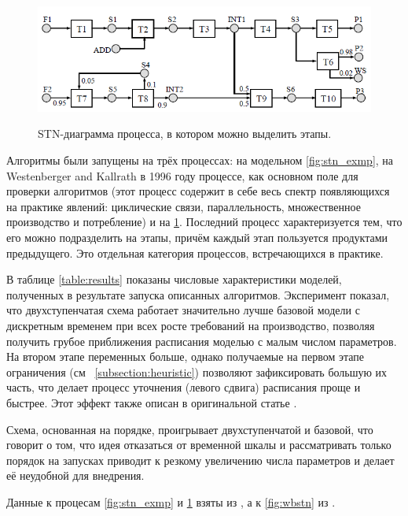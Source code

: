 \documentclass[12pt, twoside]{article}
\theoremstyle{definition}
\begin{document}
\begin{figure}[h]
\caption{STN-диаграмма процесса, в котором можно выделить этапы.}
\centering
\includegraphics[width=1.0\textwidth]{stagedstn}
\label{fig:stn_staged}
\end{figure}

Алгоритмы были запущены на трёх процессах: на модельном \ref{fig:stn_exmp}, на Westenberger and Kallrath в 1996 году процессе, как основном поле для проверки алгоритмов (этот процесс содержит в себе весь спектр появляющихся на практике явлений: циклические связи, параллельность, множественное производство и потребление) и на \ref{fig:stn_staged}. Последний процесс характеризуется тем, что его можно подразделить на этапы, причём каждый этап пользуется продуктами предыдущего. Это отдельная категория процессов, встречающихся в практике.

В таблице \ref{table:results} показаны числовые характеристики моделей, полученных в результате запуска описанных алгоритмов. Эксперимент показал, что двухступенчатая схема работает значительно лучше базовой модели с дискретным временем при всех росте требований на производство, позволяя получить грубое приближения расписания моделью с малым числом параметров. На втором этапе переменных больше, однако получаемые на первом этапе ограничения (см ~\ref{subsection:heuristic}) позволяют зафиксировать большую их часть, что делает процесс уточнения (левого сдвига) расписания проще и быстрее. Этот эффект также описан в оригинальной статье \cite{lpheuristics}.

Схема, основанная на порядке, проигрывает двухступенчатой и базовой, что говорит о том, что идея отказаться от временной шкалы и рассматривать только порядок на запусках приводит к резкому увеличению числа параметров и делает её неудобной для внедрения.

Данные к процесам \ref{fig:stn_exmp} и \ref{fig:stn_staged} взяты из  \cite{discretetime}, а к \ref{fig:wbstn} из \cite{hybridizing}.
\end{document}
